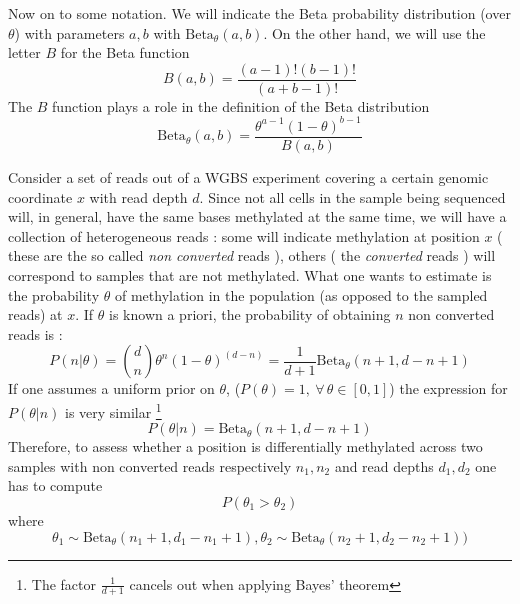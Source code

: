 \documentclass[11pt]{amsart}
\newcommand{\betapdf}{\mbox{Beta}_\theta}
\begin{document}
Now on to some notation. We will indicate the Beta probability distribution (over $\theta$) with parameters $a,b$ with 
$\betapdf(a,b)$. On the other hand, we will use the letter $B$ for the Beta function 
\[B(a,b)=\frac{(a-1)!(b-1)!}{(a+b-1)!}\] The $B$ function plays a role in the definition of the Beta distribution 
\[\betapdf(a,b)=\frac{\theta^{a-1}(1-\theta)^{b-1}}{B(a,b)}\]
 
Consider a set of reads out of a WGBS experiment covering a certain genomic coordinate $x$ with read depth $d$. Since not all cells in the sample being sequenced will, in general,  have the same bases methylated at the same time, we will have a collection of heterogeneous reads : some will indicate methylation at position $x$ ( these are the so called {\em non converted} reads ), others ( the {\em converted} reads ) will correspond to samples that are not methylated. What one wants to estimate is the probability $\theta$ of methylation in the population (as opposed to the sampled reads) at $x$.  If $\theta$ is known a priori, the probability of obtaining $n$ non converted reads is :
\[P(n|\theta)={d \choose n}\theta^n ({1-\theta})^{(d-n)}=\frac{1}{d+1}\betapdf(n+1,d-n+1)\]
If one assumes a uniform prior on $\theta$, ($P(\theta)=1, \ \forall\, \theta \in [0,1]$) the expression for $P(\theta|n)$ is very similar \footnote{The factor $\frac{1}{d+1}$ cancels out when applying Bayes' theorem}
\[P(\theta|n)=\betapdf(n+1,d-n+1)\]
Therefore, to assess whether a position is differentially methylated across two samples with non converted reads respectively $n_1,n_2$ and read depths $d_1,d_2$ one
has to compute 
\[P(\theta_1>\theta_2) \] where 
\[ \theta_1 \sim \betapdf(n_1+1,d_1-n_1+1) , \theta_2 \sim \betapdf(n_2+1,d_2-n_2+1))\]\label{ineq}

 
\end{document}
